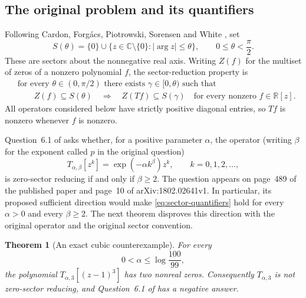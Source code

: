 \documentclass[11pt,a4paper]{article}
\newtheorem{theorem}{Theorem}[section]
\theoremstyle{definition}
\theoremstyle{remark}
\begin{document}
\subsection{The original problem and its quantifiers}

Following Cardon, Forg\'acs, Piotrowski, Sorensen and White
\cite{CardonEtAl2018}, set
\[
 S(\theta)=\{0\}\cup
 \{z\in\mathbb C\setminus\{0\}:|\arg z|\leq\theta\},
 \qquad 0\leq\theta<\frac{\pi}{2}.
\]
These are sectors about the nonnegative real axis.  Writing
$Z(f)$ for the multiset of zeros of a nonzero polynomial $f$, the
sector-reduction property is
\begin{equation}\label{eq:sector-quantifiers}
 \begin{split}
 &\text{for every }\theta\in(0,\pi/2)
 \text{ there exists }\gamma\in[0,\theta)\text{ such that}\\
 &\qquad Z(f)\subseteq S(\theta)
 \quad\Longrightarrow\quad Z(Tf)\subseteq S(\gamma)
 \quad\text{for every nonzero }f\in\mathbb R[z].
 \end{split}
\end{equation}
All operators considered below have strictly positive diagonal entries,
so $Tf$ is nonzero whenever $f$ is nonzero.

Question~6.1 of \cite{CardonEtAl2018} asks whether, for a positive
parameter $\alpha$, the operator (writing $\beta$ for the exponent
called $p$ in the original question)
\begin{equation}\label{eq:cardon-original-operator}
 T_{\alpha,\beta}[z^k]=\exp(-\alpha k^\beta)z^k,
 \qquad k=0,1,2,\ldots,
\end{equation}
is zero-sector reducing if and only if $\beta\geq2$.
The question appears on page~489 of the published paper and page~10
of arXiv:1802.02641v1.  In particular, its proposed sufficient direction
would make \eqref{eq:sector-quantifiers} hold for every
$\alpha>0$ and every $\beta\geq2$.  The next theorem disproves this
direction with the original operator and the original sector convention.

\begin{theorem}[An exact cubic counterexample]
\label{thm:cardon-negative}
For every
\[
 0<\alpha\leq\log\frac{100}{99},
\]
the polynomial $T_{\alpha,3}[(z-1)^3]$ has two nonreal zeros.
Consequently $T_{\alpha,3}$ is not zero-sector reducing, and
Question~6.1 of \cite{CardonEtAl2018} has a negative answer.
\end{theorem}
\end{document}
